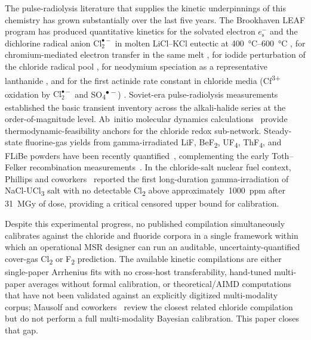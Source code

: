 \documentclass[11pt]{article}
\theoremstyle{plain}
\theoremstyle{definition}
\theoremstyle{remark}
\newcommand{\eS}{\ensuremath{e_{\mathrm{s}}^{-}}\xspace}
\newcommand{\Clt}{\ensuremath{\mathrm{Cl}_2^{\bullet-}}\xspace}
\begin{document}
The pulse-radiolysis literature that supplies the kinetic underpinnings of
this chemistry has grown substantially over the last five years.  The
Brookhaven LEAF program has produced quantitative kinetics for the solvated
electron \eS and the dichlorine radical anion \Clt in molten LiCl--KCl
eutectic at \SIrange{400}{600}{\celsius} \citep{Iwamatsu2022}, for
chromium-mediated electron transfer in the same melt
\citep{Iwamatsu2026}, for iodide perturbation of the chloride radical pool
\citep{Conrad2023}, for neodymium speciation as a representative lanthanide
\citep{CastroBaldivieso2026}, and for the first actinide rate constant in
chloride media (Cf\textsuperscript{3+} oxidation by \Clt and
SO\textsubscript{4}\textsuperscript{$\bullet-$}) \citep{Rotermund2024}.
Soviet-era pulse-radiolysis measurements
\citep{Pikaev1982,Makarov1982,Hagiwara1987} established the basic transient
inventory across the alkali-halide series at the order-of-magnitude level.
Ab~initio molecular dynamics
calculations~\citep{KristoffersenMetiu2018} provide
thermodynamic-feasibility anchors for the chloride redox sub-network.
Steady-state fluorine-gas yields from gamma-irradiated LiF, BeF\textsubscript{2},
UF\textsubscript{4}, ThF\textsubscript{4}, and FLiBe powders have been
recently quantified~\citep{Davis2022}, complementing the early Toth--Felker
recombination measurements~\citep{Toth1990}.  In the chloride-salt nuclear
fuel context, Phillips and coworkers~\citep{Phillips2022} reported the first
long-duration gamma-irradiation of NaCl-UCl\textsubscript{3} salt with no
detectable Cl\textsubscript{2} above approximately~\SI{1000}{ppm} after
\SI{31}{\mega\gray} of dose, providing a critical censored upper bound for
calibration.

Despite this experimental progress, no published compilation simultaneously
calibrates against the chloride and fluoride corpora in a single framework
within which an operational MSR designer can run an auditable,
uncertainty-quantified cover-gas Cl\textsubscript{2} or F\textsubscript{2}
prediction.  The available kinetic compilations are either single-paper
Arrhenius fits with no cross-host transferability, hand-tuned multi-paper
averages without formal calibration, or theoretical/AIMD computations that
have not been validated against an explicitly digitized multi-modality
corpus; Mausolf and coworkers~\citep{Phillips2022} review the closest related
chloride compilation but do not perform a full multi-modality Bayesian
calibration.  This paper closes that gap.
\end{document}
